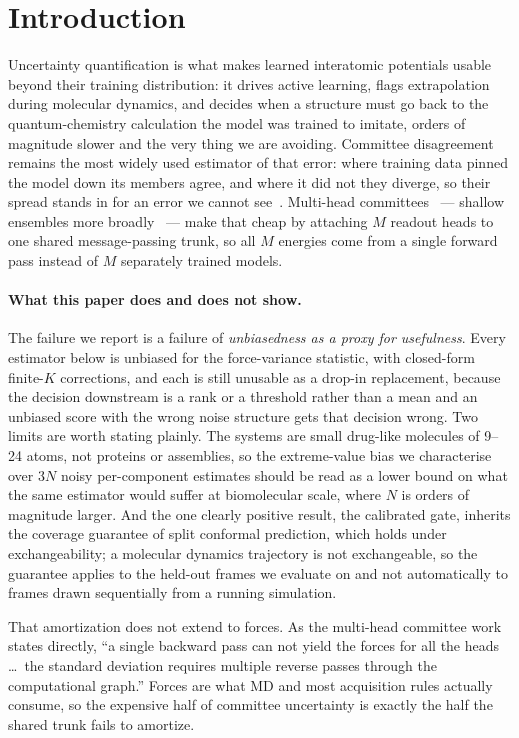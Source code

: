 \documentclass{article}
\begin{document}
\section{Introduction}
Uncertainty quantification is what makes learned interatomic potentials usable beyond their training
distribution: it drives active learning, flags extrapolation during molecular dynamics, and decides
when a structure must go back to the quantum-chemistry calculation the model was trained to imitate,
orders of magnitude slower and the very thing we are avoiding. Committee disagreement remains the
most widely used estimator of that error: where training data pinned the model down its members
agree, and where it did not they diverge, so their spread stands in for an error we cannot
see~\citep{behler2015,podryabinkin2017,carrete2023}. Multi-head
committees~\citep{beck2025mhc} --- shallow ensembles more broadly~\citep{kellner2024} --- make that
cheap by attaching $M$ readout heads to one shared message-passing trunk, so all $M$ energies come
from a single forward pass instead of $M$ separately trained models.

\paragraph{What this paper does and does not show.}
The failure we report is a failure of \emph{unbiasedness as a proxy for usefulness}. Every estimator
below is unbiased for the force-variance statistic, with closed-form finite-$K$ corrections, and each
is still unusable as a drop-in replacement, because the decision downstream is a rank or a threshold
rather than a mean and an unbiased score with the wrong noise structure gets that decision wrong. Two
limits are worth stating plainly. The systems are small drug-like molecules of 9--24 atoms, not
proteins or assemblies, so the extreme-value bias we characterise over $3N$ noisy per-component
estimates should be read as a lower bound on what the same estimator would suffer at biomolecular
scale, where $N$ is orders of magnitude larger. And the one clearly positive result, the calibrated
gate, inherits the coverage guarantee of split conformal prediction, which holds under
exchangeability; a molecular dynamics trajectory is not exchangeable, so the guarantee applies to the
held-out frames we evaluate on and not automatically to frames drawn sequentially from a running
simulation.

That amortization does not extend to forces. As the multi-head committee work states directly, ``a
single backward pass can not yield the forces for all the heads \ldots\ the standard deviation
requires multiple reverse passes through the computational graph.'' Forces are what MD and most
acquisition rules actually consume, so the expensive half of committee uncertainty is exactly the
half the shared trunk fails to amortize.
\end{document}
